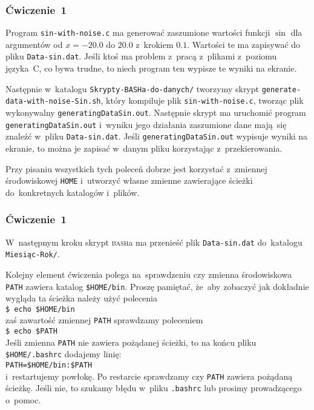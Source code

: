 \documentclass[10pt,t]{beamer}
\begin{document}
\begin{frame}
  \frametitle{Ćwiczenie~1}


  Program \texttt{sin-with-noise.c} ma generować zaszumione wartości funkcji
  $\sin$ dla argumentów od $x = -20.0$ do $20.0$ z~krokiem $0.1$.
  Wartości te ma zapisywać do pliku \texttt{Data-sin.dat}. Jeśli ktoś
  ma problem z~pracą z~plikami z~poziomu języka~C, co bywa trudne, to niech
  program ten wypisze te wyniki na ekranie.

  Następnie w~katalogu \texttt{Skrypty-BASHa-do-danych/} tworzymy
  skrypt \texttt{generate-data-with-noise-Sin.sh}, który kompiluje plik
  \texttt{sin-with-noise.c}, tworząc plik wykonywalny
  \texttt{generatingDataSin.out}. Następnie skrypt ma uruchomić program
  \texttt{generatingDataSin.out} i~wyniku jego działania zaszumione
  dane mają~się znaleźć w~pliku \texttt{Data-sin.dat}.
  Jeśli \texttt{generatingDataSin.out} wypisuje wyniki na ekranie, to
  można je zapisać w~danym pliku korzystając z~przekierowania.

  Przy pisaniu wszystkich tych poleceń dobrze jest korzystać z~zmiennej
  środowiskowej \texttt{HOME} i~utworzyć własne zmienne zawierające
  ścieżki do~konkretnych katalogów i~plików.

\end{frame}





\begin{frame}
  \frametitle{Ćwiczenie~1}


  W~następnym kroku skrypt \textsc{bash}a ma przenieść plik
  \texttt{Data-sin.dat} do~katalogu \texttt{Miesiąc-Rok/}.

  Kolejny element ćwiczenia polega na~sprawdzeniu czy zmienna środowiskowa
  \texttt{PATH} zawiera katalog \texttt{\$HOME/bin}. Proszę pamiętać,
  że~aby zobaczyć jak dokładnie wygląda ta ścieżka należy użyć polecenia \\
  \texttt{\$ echo \$HOME/bin} \\
  zaś zawartość zmiennej \texttt{PATH} sprawdzamy poleceniem \\
  \texttt{\$ echo \$PATH} \\
  Jeśli zmienna \texttt{PATH} nie zawiera pożądanej ścieżki, to na końcu
  pliku \texttt{\$HOME/.bashrc} dodajemy linię: \\
  \texttt{PATH=\$HOME/bin:\$PATH} \\
  i~restartujemy powłokę. Po restarcie sprawdzamy czy \texttt{PATH}
  zawiera pożądaną ścieżkę. Jeśli nie, to szukamy błędu w~pliku
  \texttt{.bashrc} lub prosimy prowadzącego o~pomoc.

\end{frame}
\end{document}
